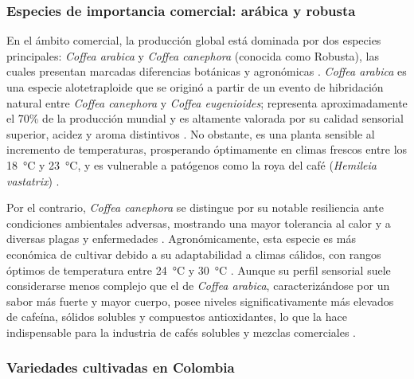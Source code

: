 \subsubsection{Especies de importancia comercial: arábica y robusta}

En el ámbito comercial, la producción global está dominada por dos especies principales: \textit{Coffea arabica} y \textit{Coffea canephora} (conocida como Robusta), las cuales presentan marcadas diferencias botánicas y agronómicas \parencite{himri_comparative_2025, tieghi_effects_2024}. \textit{Coffea arabica} es una especie alotetraploide que se originó a partir de un evento de hibridación natural entre \textit{Coffea canephora} y \textit{Coffea eugenioides}; representa aproximadamente el 70\% de la producción mundial y es altamente valorada por su calidad sensorial superior, acidez y aroma distintivos \parencite{park_comparative_2025, baschenis_comparative_2026, escuela_superior_politecnica_agropecuaria_de_manabi_manuel_felix_lopez_carrera_de_ingenieria_agricola_postharvest_2023, gallardo-ignacio_chemical_2023}. No obstante, es una planta sensible al incremento de temperaturas, prosperando óptimamente en climas frescos entre los 18~°C y 23~°C, y es vulnerable a patógenos como la roya del café (\textit{Hemileia vastatrix}) \parencite{park_comparative_2025, febrianto_coffee_2023}.

Por el contrario, \textit{Coffea canephora} se distingue por su notable resiliencia ante condiciones ambientales adversas, mostrando una mayor tolerancia al calor y a diversas plagas y enfermedades \parencite{escuela_superior_politecnica_agropecuaria_de_manabi_manuel_felix_lopez_carrera_de_ingenieria_agricola_postharvest_2023, suryono_physicochemical_2024}. Agronómicamente, esta especie es más económica de cultivar debido a su adaptabilidad a climas cálidos, con rangos óptimos de temperatura entre 24~°C y 30~°C \parencite{park_comparative_2025, suryono_physicochemical_2024}. Aunque su perfil sensorial suele considerarse menos complejo que el de \textit{Coffea arabica}, caracterizándose por un sabor más fuerte y mayor cuerpo, posee niveles significativamente más elevados de cafeína, sólidos solubles y compuestos antioxidantes, lo que la hace indispensable para la industria de cafés solubles y mezclas comerciales \parencite{hasan_comparative_2024, escuela_superior_politecnica_agropecuaria_de_manabi_manuel_felix_lopez_carrera_de_ingenieria_agricola_postharvest_2023, himri_comparative_2025, tieghi_effects_2024}.

\subsubsection{Variedades cultivadas en Colombia}

